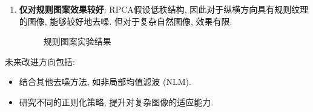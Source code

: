 \documentclass[10pt]{article}
\begin{document}
\begin{enumerate}
			\item \textbf{仅对规则图案效果较好}: RPCA假设低秩结构, 因此对于纵横方向具有规则纹理的图像, 能够较好地去噪. 但对于复杂自然图像, 效果有限.
				\begin{figure}[htbp]
					\centering
					\caption{规则图案实验结果}
				\end{figure}
		\end{enumerate}

		未来改进方向包括:

		\begin{itemize}
			\item 结合其他去噪方法, 如非局部均值滤波 (NLM).
			\item 研究不同的正则化策略, 提升对复杂图像的适应能力.
		\end{itemize}
\end{document}
